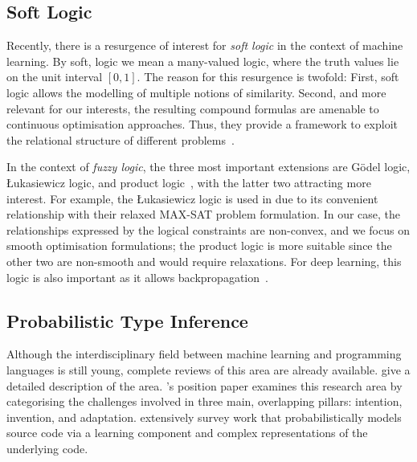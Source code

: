 \documentclass[acmsmall, review, anonymous]{acmart}\settopmatter{printfolios=true,printccs=false,printacmref=false}
\begin{document}
 
\subsection{Soft Logic}\label{ssec:softlogic}
Recently, there is a resurgence of interest for \textit{soft logic} in the context of machine learning. By soft, logic we mean a many-valued logic, where the truth values lie on the unit interval $[0,1]$. The 
reason for this resurgence is twofold: First,
soft logic allows the modelling of multiple notions
of similarity. Second, and more relevant for our
interests, the resulting compound formulas are 
amenable to continuous optimisation approaches. Thus, they provide a framework to exploit the relational structure of different problems~\cite{kimmig12}.

In the context of \textit{fuzzy logic}, the three most
important extensions are G{\"o}del logic, {\L}ukasiewicz logic, and product logic~\cite{hajek98}, with the latter two attracting more interest. For example, the {\L}ukasiewicz logic is used in \citet{bach17} due 
to its convenient relationship with their relaxed MAX-SAT problem formulation. In our case, the relationships expressed by the logical constraints are non-convex, and we focus on smooth optimisation formulations; the product logic is more
suitable since the other two are non-smooth and 
would require relaxations. For 
deep learning, this logic is also important as it 
allows backpropagation~\cite{evans18}.

\subsection{Probabilistic Type Inference}\label{sec:ml:over:source}

Although the interdisciplinary field between machine learning and programming
languages is still young, complete reviews of this area are
already available.
\citet{vechev16} give a detailed description of the area.
\citet{threepillars}'s position paper examines this research area by categorising
the challenges involved in three main, overlapping pillars: intention, invention, and adaptation.
\citet{allamanis17} extensively survey work that probabilistically models source code via a learning component and complex representations of the underlying code.
\end{document}
